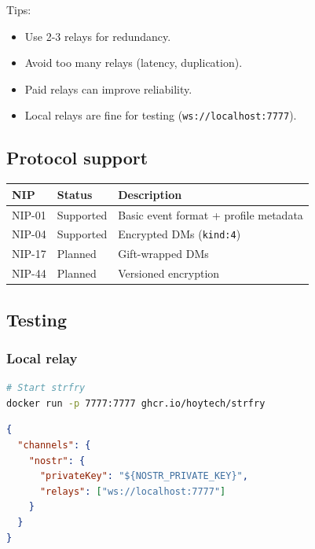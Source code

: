 Tips:

\begin{itemize}
  \item Use 2-3 relays for redundancy.
  \item Avoid too many relays (latency, duplication).
  \item Paid relays can improve reliability.
  \item Local relays are fine for testing (\texttt{ws://localhost:7777}).
\end{itemize}


\subsection{Protocol support}



\begin{table}[h]
\centering
\small
\begin{tabular}{|l|l|l|}
\hline
NIP & Status & Description \\
\hline
NIP-01 & Supported & Basic event format + profile metadata \\
\hline
NIP-04 & Supported & Encrypted DMs (\texttt{kind:4}) \\
\hline
NIP-17 & Planned & Gift-wrapped DMs \\
\hline
NIP-44 & Planned & Versioned encryption \\
\hline
\end{tabular}
\end{table}



\subsection{Testing}


\subsubsection{Local relay}


\begin{lstlisting}[language=bash]
# Start strfry
docker run -p 7777:7777 ghcr.io/hoytech/strfry
\end{lstlisting}


\begin{lstlisting}[language=json]
{
  "channels": {
    "nostr": {
      "privateKey": "${NOSTR_PRIVATE_KEY}",
      "relays": ["ws://localhost:7777"]
    }
  }
}
\end{lstlisting}


